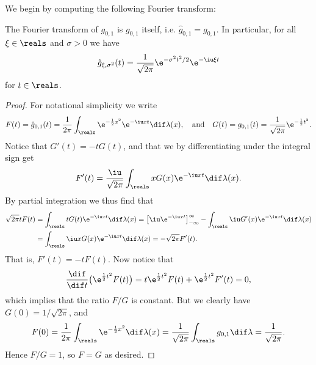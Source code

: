 \documentclass[article, a4paper, 11pt, oneside]{memoir}
\numberwithin{equation}{chapter}
\begin{document}
We begin by computing the following Fourier transform:

\begin{proposition}
    The Fourier transform of $g_{0,1}$ is $g_{0,1}$ itself, i.e. $\hat{g}_{0,1} = g_{0,1}$. In particular, for all $\xi \in \reals$ and $\sigma > 0$ we have
    \begin{equation*}
        \hat{g}_{\xi,\sigma^2}(t)
            = \frac{1}{\sqrt{2\pi}} \e^{-\sigma^2 t^2 / 2} \e^{-\iu \xi t}
    \end{equation*}
    for $t \in \reals$.
\end{proposition}

\begin{proof}
    For notational simplicity we write
    \begin{equation*}
        F(t)
            = \hat{g}_{0,1}(t)
            = \frac{1}{2\pi} \int_\reals \e^{-\frac{1}{2}x^2} \e^{-\iu xt} \dif\lambda(x),
        \quad \text{and} \quad
        G(t)
            = g_{0,1}(t)
            = \frac{1}{\sqrt{2\pi}} \e^{-\frac{1}{2}t^2}.
    \end{equation*}
    Notice that $G'(t) = -t G(t)$, and that we by differentiating under the integral sign get
    \begin{equation*}
        F'(t)
            = \frac{\iu}{\sqrt{2\pi}} \int_\reals x G(x) \e^{-\iu xt} \dif\lambda(x).
    \end{equation*}
    By partial integration we thus find that
    \begin{align*}
        \sqrt{2\pi} t F(t)
            &= \int_\reals t G(t) \e^{-\iu xt} \dif\lambda(x)
             = \bigl[ \iu \e^{-\iu xt} \bigr]_{-\infty}^\infty - \int_\reals \iu G'(x) \e^{-\iu xt} \dif\lambda(x) \\
            &= \int_\reals \iu x G(x) \e^{-\iu xt} \dif\lambda(x)
             = -\sqrt{2\pi} F'(t).
    \end{align*}
    That is, $F'(t) = -t F(t)$. Now notice that
    \begin{equation*}
        \frac{\dif}{\dif t} \bigl( \e^{\frac{1}{2}t^2} F(t) \bigr)
            = t \e^{\frac{1}{2}t^2} F(t) + \e^{\frac{1}{2}t^2} F'(t)
            = 0,
    \end{equation*}
    which implies that the ratio $F/G$ is constant. But we clearly have $G(0) = 1/\sqrt{2\pi}$, and
    \begin{equation*}
        F(0)
            = \frac{1}{2\pi} \int_\reals \e^{-\frac{1}{2}x^2}\dif\lambda(x)
            = \frac{1}{\sqrt{2\pi}} \int_\reals g_{0,1} \dif\lambda
            = \frac{1}{\sqrt{2\pi}}.
    \end{equation*}
    Hence $F/G = 1$, so $F = G$ as desired.


\end{proof}
\end{document}
